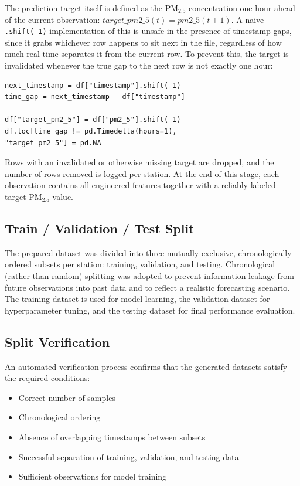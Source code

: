 The prediction target itself is defined as the PM$_{2.5}$ concentration one hour ahead
of the current observation: $target\_pm2\_5(t) = pm2\_5(t+1)$. A naive
\texttt{.shift(-1)} implementation of this is unsafe in the presence of timestamp gaps,
since it grabs whichever row happens to sit next in the file, regardless of how much
real time separates it from the current row. To prevent this, the target is
invalidated whenever the true gap to the next row is not exactly one hour:

\begin{verbatim}
next_timestamp = df["timestamp"].shift(-1)
time_gap = next_timestamp - df["timestamp"]

df["target_pm2_5"] = df["pm2_5"].shift(-1)
df.loc[time_gap != pd.Timedelta(hours=1), 
"target_pm2_5"] = pd.NA
\end{verbatim}

Rows with an invalidated or otherwise missing target are dropped, and the number of
rows removed is logged per station. At the end of this stage, each observation
contains all engineered features together with a reliably-labeled target PM$_{2.5}$
value.

\subsection{Train / Validation / Test Split}

The prepared dataset was divided into three mutually exclusive, chronologically
ordered subsets per station: training, validation, and testing. Chronological (rather
than random) splitting was adopted to prevent information leakage from future
observations into past data and to reflect a realistic forecasting scenario. The
training dataset is used for model learning, the validation dataset for hyperparameter
tuning, and the testing dataset for final performance evaluation.

\subsection{Split Verification}

An automated verification process confirms that the generated datasets satisfy the
required conditions:

\begin{itemize}
    \item Correct number of samples
    \item Chronological ordering
    \item Absence of overlapping timestamps between subsets
    \item Successful separation of training, validation, and testing data
    \item Sufficient observations for model training
\end{itemize}

